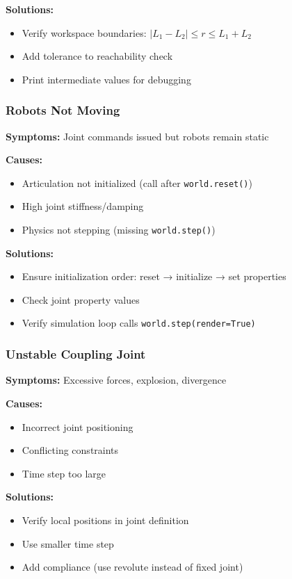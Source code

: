 \documentclass[11pt,a4paper]{article}
\begin{document}
\textbf{Solutions:}
\begin{itemize}
    \item Verify workspace boundaries: $|L_1-L_2| \leq r \leq L_1+L_2$
    \item Add tolerance to reachability check
    \item Print intermediate values for debugging
\end{itemize}

\subsubsection{Robots Not Moving}

\textbf{Symptoms:} Joint commands issued but robots remain static

\textbf{Causes:}
\begin{itemize}
    \item Articulation not initialized (call after \texttt{world.reset()})
    \item High joint stiffness/damping
    \item Physics not stepping (missing \texttt{world.step()})
\end{itemize}

\textbf{Solutions:}
\begin{itemize}
    \item Ensure initialization order: reset → initialize → set properties
    \item Check joint property values
    \item Verify simulation loop calls \texttt{world.step(render=True)}
\end{itemize}

\subsubsection{Unstable Coupling Joint}

\textbf{Symptoms:} Excessive forces, explosion, divergence

\textbf{Causes:}
\begin{itemize}
    \item Incorrect joint positioning
    \item Conflicting constraints
    \item Time step too large
\end{itemize}

\textbf{Solutions:}
\begin{itemize}
    \item Verify local positions in joint definition
    \item Use smaller time step
    \item Add compliance (use revolute instead of fixed joint)
\end{itemize}
\end{document}
